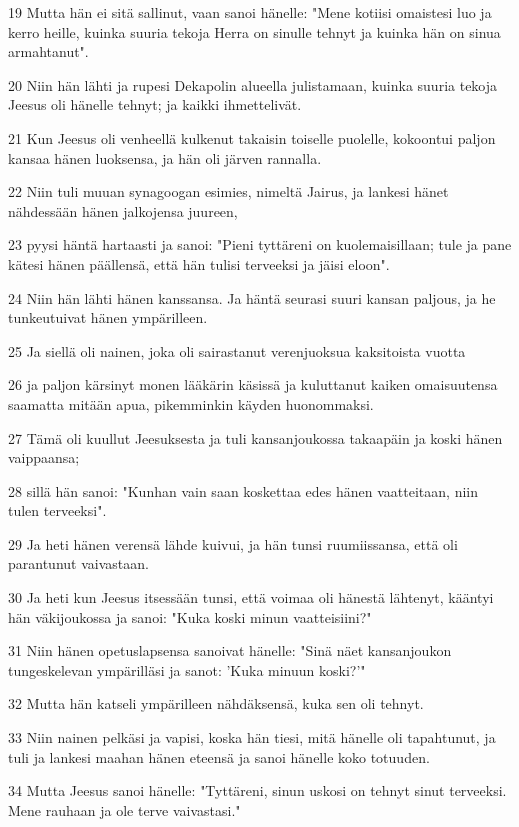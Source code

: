 \par 19 Mutta hän ei sitä sallinut, vaan sanoi hänelle: "Mene kotiisi omaistesi luo ja kerro heille, kuinka suuria tekoja Herra on sinulle tehnyt ja kuinka hän on sinua armahtanut".
\par 20 Niin hän lähti ja rupesi Dekapolin alueella julistamaan, kuinka suuria tekoja Jeesus oli hänelle tehnyt; ja kaikki ihmettelivät.
\par 21 Kun Jeesus oli venheellä kulkenut takaisin toiselle puolelle, kokoontui paljon kansaa hänen luoksensa, ja hän oli järven rannalla.
\par 22 Niin tuli muuan synagoogan esimies, nimeltä Jairus, ja lankesi hänet nähdessään hänen jalkojensa juureen,
\par 23 pyysi häntä hartaasti ja sanoi: "Pieni tyttäreni on kuolemaisillaan; tule ja pane kätesi hänen päällensä, että hän tulisi terveeksi ja jäisi eloon".
\par 24 Niin hän lähti hänen kanssansa. Ja häntä seurasi suuri kansan paljous, ja he tunkeutuivat hänen ympärilleen.
\par 25 Ja siellä oli nainen, joka oli sairastanut verenjuoksua kaksitoista vuotta
\par 26 ja paljon kärsinyt monen lääkärin käsissä ja kuluttanut kaiken omaisuutensa saamatta mitään apua, pikemminkin käyden huonommaksi.
\par 27 Tämä oli kuullut Jeesuksesta ja tuli kansanjoukossa takaapäin ja koski hänen vaippaansa;
\par 28 sillä hän sanoi: "Kunhan vain saan koskettaa edes hänen vaatteitaan, niin tulen terveeksi".
\par 29 Ja heti hänen verensä lähde kuivui, ja hän tunsi ruumiissansa, että oli parantunut vaivastaan.
\par 30 Ja heti kun Jeesus itsessään tunsi, että voimaa oli hänestä lähtenyt, kääntyi hän väkijoukossa ja sanoi: "Kuka koski minun vaatteisiini?"
\par 31 Niin hänen opetuslapsensa sanoivat hänelle: "Sinä näet kansanjoukon tungeskelevan ympärilläsi ja sanot: 'Kuka minuun koski?'"
\par 32 Mutta hän katseli ympärilleen nähdäksensä, kuka sen oli tehnyt.
\par 33 Niin nainen pelkäsi ja vapisi, koska hän tiesi, mitä hänelle oli tapahtunut, ja tuli ja lankesi maahan hänen eteensä ja sanoi hänelle koko totuuden.
\par 34 Mutta Jeesus sanoi hänelle: "Tyttäreni, sinun uskosi on tehnyt sinut terveeksi. Mene rauhaan ja ole terve vaivastasi."
